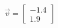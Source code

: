 \documentclass[preview]{standalone}
\begin{document}
\begin{align*}
\vec{v}=\begin{bmatrix}-1.4\\1.9\end{bmatrix}
\end{align*}
\end{document}
